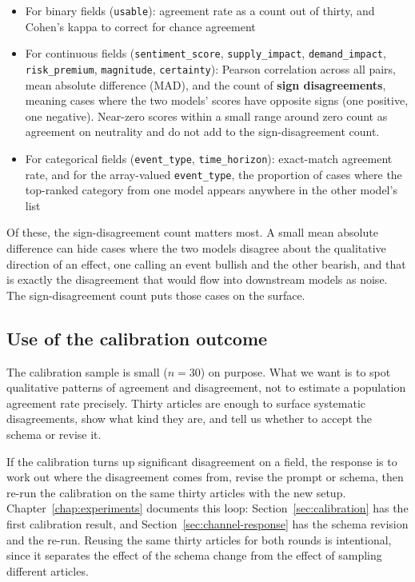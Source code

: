 \begin{itemize}
  \item For binary fields (\texttt{usable}): agreement rate as a count out of thirty, and Cohen's kappa to correct for chance agreement
  \item For continuous fields (\texttt{sentiment\_score}, \texttt{supply\_impact}, \texttt{demand\_impact}, \texttt{risk\_premium}, \texttt{magnitude}, \texttt{certainty}): Pearson correlation across all pairs, mean absolute difference (MAD), and the count of \textbf{sign disagreements}, meaning cases where the two models' scores have opposite signs (one positive, one negative). Near-zero scores within a small range around zero count as agreement on neutrality and do not add to the sign-disagreement count.
  \item For categorical fields (\texttt{event\_type}, \texttt{time\_horizon}): exact-match agreement rate, and for the array-valued \texttt{event\_type}, the proportion of cases where the top-ranked category from one model appears anywhere in the other model's list
\end{itemize}

Of these, the sign-disagreement count matters most. A small mean absolute difference can hide cases where the two models disagree about the qualitative direction of an effect, one calling an event bullish and the other bearish, and that is exactly the disagreement that would flow into downstream models as noise. The sign-disagreement count puts those cases on the surface.

\subsection{Use of the calibration outcome}\label{sec:calibration-use}

The calibration sample is small ($n = 30$) on purpose. What we want is to spot qualitative patterns of agreement and disagreement, not to estimate a population agreement rate precisely. Thirty articles are enough to surface systematic disagreements, show what kind they are, and tell us whether to accept the schema or revise it.

If the calibration turns up significant disagreement on a field, the response is to work out where the disagreement comes from, revise the prompt or schema, then re-run the calibration on the same thirty articles with the new setup. Chapter~\ref{chap:experiments} documents this loop: Section~\ref{sec:calibration} has the first calibration result, and Section~\ref{sec:channel-response} has the schema revision and the re-run. Reusing the same thirty articles for both rounds is intentional, since it separates the effect of the schema change from the effect of sampling different articles.
